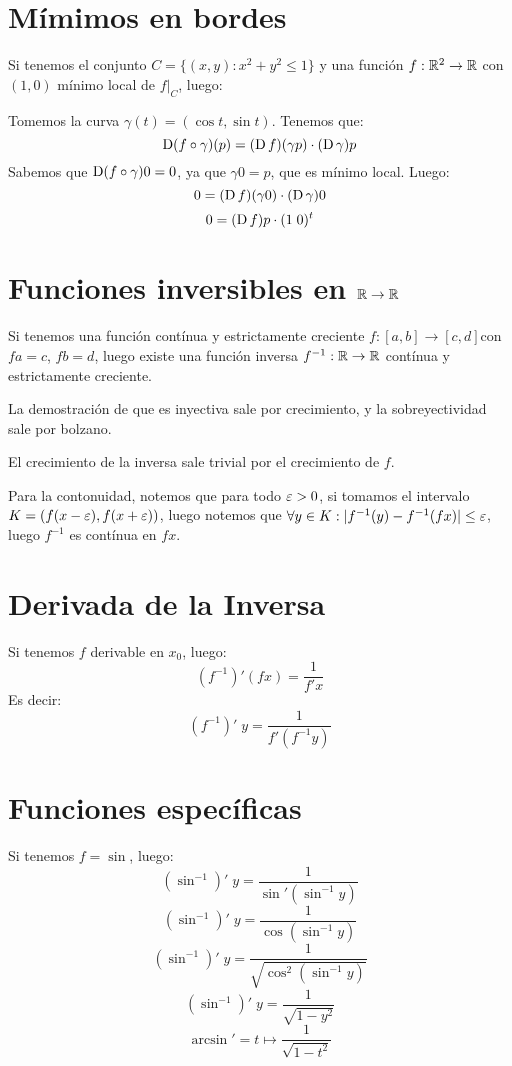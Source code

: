 \documentclass{article}
\begin{document}
\section*{Mímimos en bordes}
Si tenemos el conjunto $C = \{(x,y) : x^2 + y^2 \leq 1\}$ y una función $f : \mathbb{R}^2 \to \mathbb{R}$ con $(1, 0)$ mínimo local de $f | _C$, luego:

Tomemos la curva $\gamma (t) = (\cos t, \sin t)$. Tenemos que:
\[
	\operatorname{D} (f \circ \gamma) (p) = (\operatorname{D} f) (\gamma p) \cdot (\operatorname{D} \gamma) p
\]
Sabemos que $\operatorname{D} (f \circ \gamma) 0 = 0$, ya que $\gamma 0 = p$, que es mínimo local. Luego:
\[
	0 = (\operatorname{D} f)(\gamma 0) \cdot (\operatorname{D} \gamma) 0
\]
\[
	0 = (\operatorname{D} f)p \cdot (1 \; 0)^t
\]

\section*{Funciones inversibles en $\mathbb{R} \to \mathbb{R}$}
Si tenemos una función contínua y estrictamente creciente $f : [a,b] \to [c,d]$con $fa = c$, $fb = d$, luego existe una función inversa $f ^ {-1} : \mathbb{R} \to \mathbb{R}$ contínua y estrictamente creciente.

La demostración de que es inyectiva sale por crecimiento, y la sobreyectividad sale por bolzano.

El crecimiento de la inversa sale trivial por el crecimiento de $f$.

Para la contonuidad, notemos que para todo $\varepsilon > 0$, si tomamos el intervalo $K = (f(x-\varepsilon), f(x+\varepsilon))$, luego notemos que $\forall y \in K: |f^{-1}(y) - f^{-1}(fx)| \leq \varepsilon$, luego $f^{-1}$ es contínua en $fx$.

\section*{Derivada de la Inversa}
Si tenemos $f$ derivable en $x_0$, luego:
\[
	(f^{-1})'(fx) = \frac{1}{f'x}
\]
Es decir:
\[
	(f^{-1})' \; y = \frac{1}{f'(f^{-1}y)}
\]

\section*{Funciones específicas}
Si tenemos $f = \sin$, luego:
\[
	(\sin^{-1})' \; y = \frac{1}{\sin' (\sin^{-1} y)}
\]
\[
	(\sin^{-1})' \; y = \frac{1}{\cos (\sin^{-1} y)}
\]
\[
	(\sin^{-1})' \; y = \frac{1}{\sqrt{\cos^2 (\sin^{-1} y)}}
\]
\[
	(\sin^{-1})' \; y = \frac{1}{\sqrt{1 - y^2}}
\]
\[
	\arcsin'  = t \mapsto \frac{1}{\sqrt{1-t^2}}
\]
\end{document}
